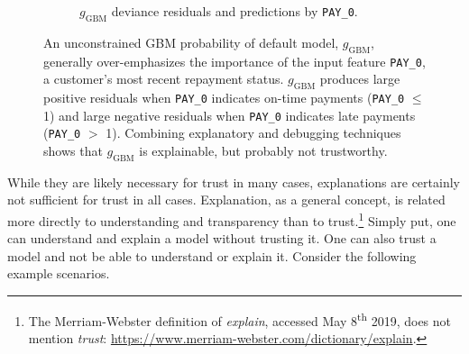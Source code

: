 \documentclass[fleqn]{article}
\begin{document}
\begin{figure}[htb!]
\begin{subfigure}{.5\textwidth}
  		\caption{$g_{\text{GBM}}$ deviance residuals and predictions by \texttt{PAY\_0}.}
  		\label{fig:resid}
	\end{subfigure}
	\caption{An unconstrained GBM probability of default model, $g_{\text{GBM}}$, generally over-emphasizes the importance of the input feature \texttt{PAY\_0}, a customer's most recent repayment status. $g_{\text{GBM}}$ produces large positive residuals when \texttt{PAY\_0} indicates on-time payments (\texttt{PAY\_0} $\leq$ 1) and large negative residuals when \texttt{PAY\_0} indicates late payments (\texttt{PAY\_0} $>$ 1). Combining explanatory and debugging techniques shows that $g_{\text{GBM}}$ is explainable, but probably not trustworthy.}
	\label{fig:global_shap_resid}
\end{figure}

While they are likely necessary for trust in many cases, explanations are certainly not sufficient for trust in all cases. Explanation, as a general concept, is related more directly to understanding and transparency than to trust.\footnote{The Merriam-Webster definition of \textit{explain}, accessed May 8\textsuperscript{th} 2019, does not mention \textit{trust}: \url{https://www.merriam-webster.com/dictionary/explain}.} Simply put, one can understand and explain a model without trusting it. One can also trust a model and not be able to understand or explain it. Consider the following example scenarios.
\end{document}
